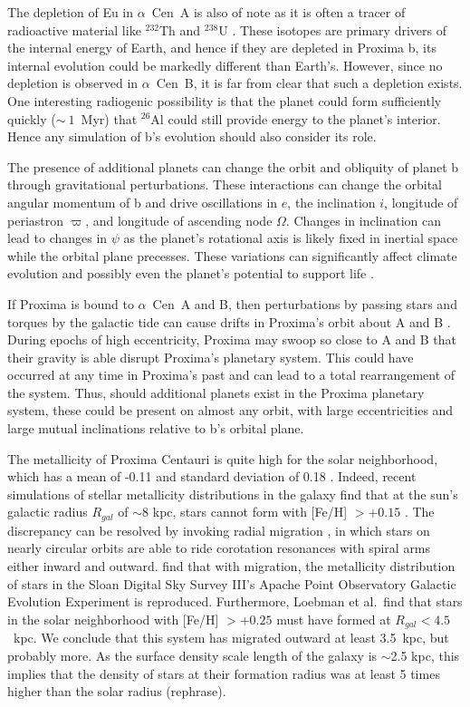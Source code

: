 \documentclass[preprint,12pt]{aastex}
\newcommand{\xxx}[1]{{\color{red} #1}} %
\newcommand{\xxx}[1]{{\color{red} #1}} %
\def\acen{{$\alpha$~Cen}}
\begin{document}
The depletion of Eu in \acen~A is also of note as it is often a tracer
of radioactive material like $^{232}$Th and $^{238}$U
\citep{Young14}. These isotopes are primary drivers of the internal
energy of Earth, and hence if they are depleted in Proxima b, its
internal evolution could be markedly different than Earth's. However,
since no depletion is observed in \acen~B, it is far from clear that
such a depletion exists. One interesting radiogenic possibility is
that the planet could form sufficiently quickly ($\sim~1$~Myr) that
$^{26}$Al could still provide energy to the planet's interior. Hence any
simulation of b's evolution should also consider its role.

The presence of additional planets can change the orbit and obliquity
of planet b through gravitational perturbations. These interactions
can change the orbital angular momentum of b and drive oscillations in
$e$, the inclination $i$, longitude of periastron $\varpi$, and
longitude of ascending node $\Omega$. Changes in inclination can lead
to changes in $\psi$ as the planet's rotational axis is likely fixed
in inertial space while the orbital plane precesses. These variations
can significantly affect climate evolution and possibly even the
planet's potential to support life \citep{Armstrong14}.

If Proxima is bound to \acen~A and B, then perturbations by passing
stars and torques by the galactic tide can cause drifts in Proxima's
orbit about A and B \citep{Kaib13}. During epochs of high
eccentricity, Proxima may swoop so close to A and B that their gravity
is able disrupt Proxima's planetary system. This could have occurred
at any time in Proxima's past and can lead to a total rearrangement of
the system. Thus, should additional planets exist in the Proxima
planetary system, these could be present on almost any orbit, with large
eccentricities and large mutual inclinations relative to b's orbital plane.

The metallicity of Proxima Centauri is quite high for the solar
neighborhood, which has a mean of -0.11 and standard deviation of 0.18
\citep{AllendePrieto04}. Indeed, recent simulations of stellar
metallicity distributions in the galaxy find that at the sun's
galactic radius $R_{gal}$ of $\sim$8 kpc, stars cannot form with
[Fe/H] $> +0.15$ \citep{Loebman16}. The discrepancy can be resolved by
invoking radial migration \citep{SellwoodBinney02}, in which stars on
nearly circular orbits are able to ride corotation resonances with
spiral arms either inward and outward. \cite{Loebman16} find that with
migration, the metallicity distribution of stars in the Sloan Digital
Sky Survey III's Apache Point Observatory Galactic Evolution
Experiment \citep{Hayden15} is reproduced. Furthermore, Loebman et
al.\ find that stars in the solar neighborhood with [Fe/H] $> +0.25$
must have formed at $R_{gal} < 4.5$~kpc. We conclude that this system
has migrated outward at least 3.5~kpc, but probably more. As the surface
density scale length of the galaxy is $\sim$2.5 kpc, this implies that
the density of stars at their formation radius was at least 5 times
higher than \xxx{the solar radius (rephrase)}.
\end{document}
